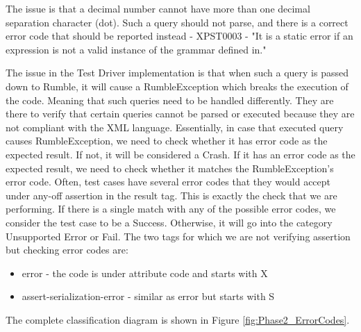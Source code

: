 

The issue is that a decimal number cannot have more than one decimal separation character (dot). Such a query should not parse, and there is a correct error code that should be reported instead - XPST0003 - "It is a static error if an expression is not a valid instance of the grammar defined in." 

The issue in the Test Driver implementation is that when such a query is passed down to Rumble, it will cause a RumbleException which breaks the execution of the code. Meaning that such queries need to be handled differently. They are there to verify that certain queries cannot be parsed or executed because they are not compliant with the XML language. Essentially, in case that executed query causes RumbleException, we need to check whether it has error code as the expected result. If not, it will be considered a Crash. If it has an error code as the expected result, we need to check whether it matches the RumbleException's error code. Often, test cases have several error codes that they would accept under any-off assertion in the result tag. This is exactly the check that we are performing. If there is a single match with any of the possible error codes, we consider the test case to be a Success. Otherwise, it will go into the category Unsupported Error or Fail. The two tags for which we are not verifying assertion but checking error codes are:
\begin{itemize}
	\item error - the code is under attribute code and starts with X
	\item assert-serialization-error - similar as error but starts with S
\end{itemize}
The complete classification diagram is shown in Figure \ref{fig:Phase2_ErrorCodes}.

